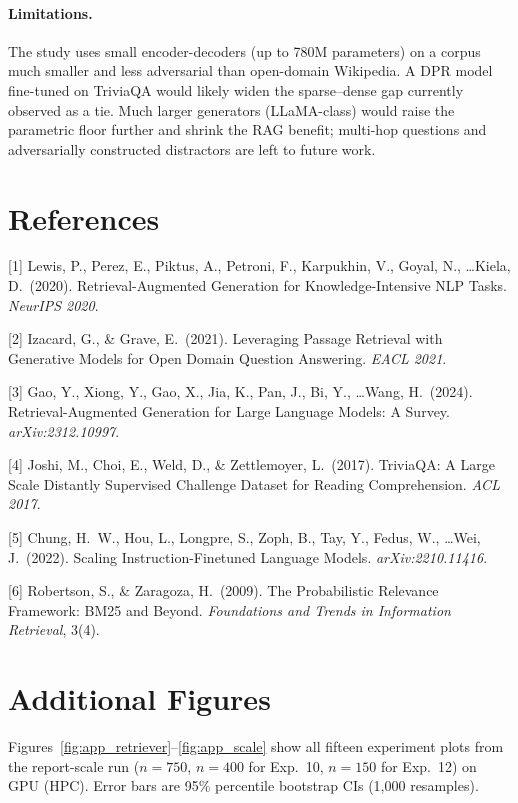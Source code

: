 \documentclass{article}
\begin{document}
\paragraph{Limitations.}
The study uses small encoder-decoders (up to 780M parameters) on a
corpus much smaller and less adversarial than open-domain Wikipedia.
A DPR model fine-tuned on TriviaQA would likely widen the sparse--dense
gap currently observed as a tie.
Much larger generators (LLaMA-class) would raise the parametric floor
further and shrink the RAG benefit; multi-hop questions and
adversarially constructed distractors are left to future work.

\section*{References}

\small

[1] Lewis, P., Perez, E., Piktus, A., Petroni, F., Karpukhin, V.,
Goyal, N., \ldots Kiela, D.\ (2020). Retrieval-Augmented Generation for
Knowledge-Intensive NLP Tasks. \textit{NeurIPS 2020}.

[2] Izacard, G., \& Grave, E.\ (2021). Leveraging Passage Retrieval with
Generative Models for Open Domain Question Answering.
\textit{EACL 2021}.

[3] Gao, Y., Xiong, Y., Gao, X., Jia, K., Pan, J., Bi, Y., \ldots Wang, H.\
(2024). Retrieval-Augmented Generation for Large Language Models:
A Survey. \textit{arXiv:2312.10997}.

[4] Joshi, M., Choi, E., Weld, D., \& Zettlemoyer, L.\ (2017). TriviaQA:
A Large Scale Distantly Supervised Challenge Dataset for Reading
Comprehension. \textit{ACL 2017}.

[5] Chung, H.~W., Hou, L., Longpre, S., Zoph, B., Tay, Y., Fedus, W.,
\ldots Wei, J.\ (2022). Scaling Instruction-Finetuned Language Models.
\textit{arXiv:2210.11416}.

[6] Robertson, S., \& Zaragoza, H.\ (2009). The Probabilistic Relevance
Framework: BM25 and Beyond.
\textit{Foundations and Trends in Information Retrieval}, 3(4).

\appendix

\section{Additional Figures}

Figures~\ref{fig:app_retriever}--\ref{fig:app_scale} show all
fifteen experiment plots from the report-scale run ($n\!=\!750$,
$n\!=\!400$ for Exp.~10, $n\!=\!150$ for Exp.~12) on GPU (HPC).
Error bars are 95\% percentile bootstrap CIs (1{,}000 resamples).
\end{document}
